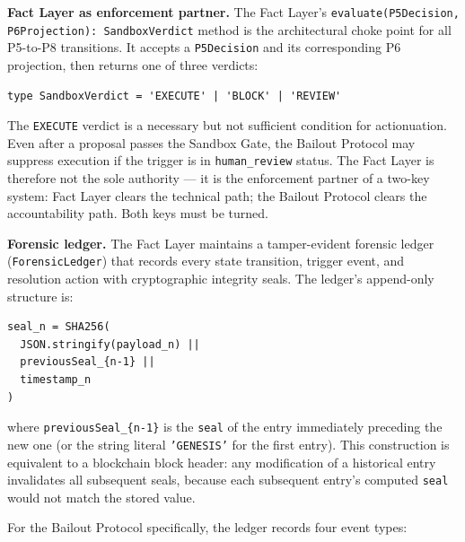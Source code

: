 \bigskip
\noindent\textbf{Fact Layer as enforcement partner.}  The Fact Layer's
\texttt{evaluate(P5Decision, P6Projection): SandboxVerdict} method is the
architectural choke point for all P5-to-P8 transitions.  It accepts a
\texttt{P5Decision} and its corresponding P6 projection, then returns one of
three verdicts:

\begin{verbatim}
type SandboxVerdict = 'EXECUTE' | 'BLOCK' | 'REVIEW'
\end{verbatim}

The \texttt{EXECUTE} verdict is a necessary but not sufficient condition for
actionuation.  Even after a proposal passes the Sandbox Gate, the Bailout Protocol
may suppress execution if the trigger is in \texttt{human\_review} status.
The Fact Layer is therefore not the sole authority --- it is the enforcement partner
of a two-key system: Fact Layer clears the technical path; the Bailout Protocol
clears the accountability path.  Both keys must be turned.

\bigskip
\noindent\textbf{Forensic ledger.}  The Fact Layer maintains a tamper-evident
forensic ledger (\texttt{ForensicLedger}) that records every state transition,
trigger event, and resolution action with cryptographic integrity seals.
The ledger's append-only structure is:

\begin{verbatim}
seal_n = SHA256(
  JSON.stringify(payload_n) ||
  previousSeal_{n-1} ||
  timestamp_n
)
\end{verbatim}

where \texttt{previousSeal\_\{n-1\}} is the \texttt{seal} of the entry immediately
preceding the new one (or the string literal \texttt{'GENESIS'} for the first entry).
This construction is equivalent to a blockchain block header: any modification of a
historical entry invalidates all subsequent seals, because each subsequent entry's
computed \texttt{seal} would not match the stored value.

For the Bailout Protocol specifically, the ledger records four event types:

